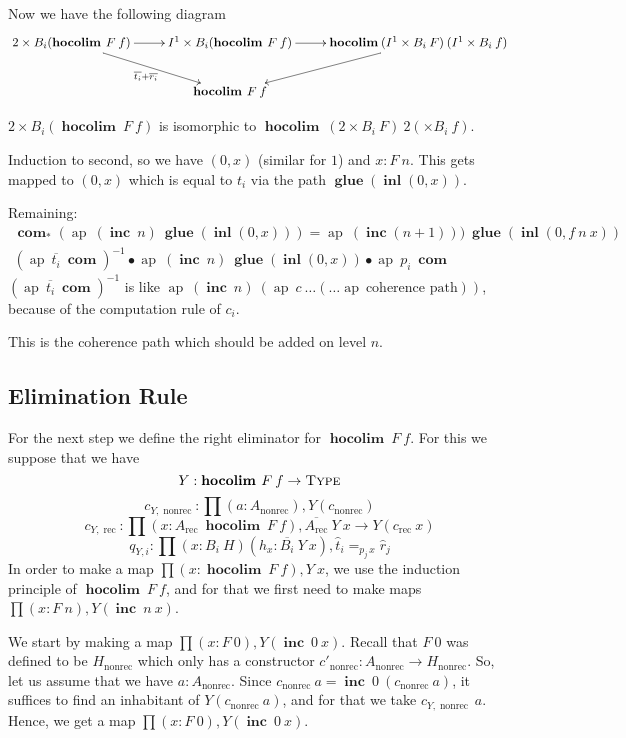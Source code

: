 \documentclass[a4paper,UKenglish]{lipics-v2016}
\newcommand{\conc}[0]{\bullet}
\newcommand{\rec}[0]{\operatorname{rec}}
\newcommand{\nonrec}[0]{\operatorname{nonrec}}
\newcommand{\ap}[0]{\operatorname{ap}}
\newcommand{\hocolim}[0]{\operatorname{\textbf{hocolim}}}
\newcommand{\inl}[0]{\operatorname{\textbf{inl}}}
\newcommand{\glue}[0]{\operatorname{\textbf{glue}}}
\newcommand{\inc}[0]{\operatorname{\textbf{inc}}}
\newcommand{\com}[0]{\operatorname{\textbf{com}}}
\newcommand{\Type}[0]{\operatorname{\textsc{Type}}}
\newcommand{\dak}[1]{\widehat{#1}}
\newcommand{\hatt}{\dak{t}}
\newcommand{\hatr}{\dak{r}}
\begin{document}
Now we have the following diagram
\[
\xymatrix
{
	2 \times B_i(\hocolim \> F \> f) \ar[r] \ar[dr]_{\overline{t_i} + \overline{r_i}} & I^1 \times B_i(\hocolim \> F \> f) \ar[r] & \hocolim \> (I^1 \times B_i \> F) \> (I^1 \times B_i \> f) \ar[dl]\\
	& \hocolim \> F \> f
}
\]

$2 \times B_i(\hocolim \> F \> f)$ is isomorphic to $\hocolim \> (2 \times B_i \> F) \> 2 (\times B_i \> f)$.

Induction to second, so we have $(0, x)$ (similar for $1$) and $x : F \> n$.
This gets mapped to $(0, x)$ which is equal to $t_i$ via the path $\glue (\inl (0, x))$.

Remaining:
\begin{equation*}
\begin{split}
\com_*(\ap \> (\inc \> n) \> \glue (\inl (0, x))) = \ap \> (\inc (n+1))) \>\glue (\inl (0, f \> n \> x))\\
(\ap \> \overline{t_i} \> \com)^{-1} \conc \ap \> (\inc \> n) \> \glue (\inl (0, x)) \conc \ap \> p_i \> \com
\end{split}
\end{equation*}
$(\ap \> \overline{t_i} \> \com)^{-1}$ is like $\ap \> (\inc \> n) \> (\ap \> c \> \ldots (\ldots \ap \> \text{coherence path}))$, because of the computation rule of $c_i$.

This is the coherence path which should be added on level $n$.


\subsection{Elimination Rule}
For the next step we define the right eliminator for $\hocolim \> F \> f$. 
For this we suppose that we have
\[
Y : \hocolim \> F \> f \rightarrow \Type
\]
\[
c_{Y, \nonrec} : \prod (a : A_{\nonrec}), Y(c_{\nonrec})
\]
\[
c_{Y, \rec} : \prod (x : A_{\rec} \> \hocolim \> F \> f), \overline{A_{\rec}} \> Y \> x \rightarrow Y(c_{\rec} \> x)
\]
\[
q_{Y, i} : \prod (x : B_i \> H)(h_x : \overline{B_i} \> Y \> x), \hatt_i =_{p_j \, x} \hatr_j
\]
In order to make a map $\prod (x : \hocolim \> F \> f), Y \> x$, we use the induction principle of $\hocolim \> F \> f$, and for that we first need to make maps $\prod (x : F \> n), Y(\inc \> n \> x)$.

We start by making a map $\prod (x : F \> 0), Y(\inc \> 0 \> x)$.
Recall that $F \> 0$ was defined to be $H_{\nonrec}$ which only has a constructor $c'_{\nonrec} : A_{\nonrec} \rightarrow H_{\nonrec}$.
So, let us assume that we have $a : A_{\nonrec}$.
Since $c_{\nonrec} \> a = \inc \> 0 \> (c_{\nonrec} \> a)$, it suffices to find an inhabitant of $Y(c_{\nonrec} \> a)$, and for that we take $c_{Y, \nonrec} \> a$.
Hence, we get a map $\prod (x : F \> 0), Y(\inc \> 0 \> x)$.
\end{document}
